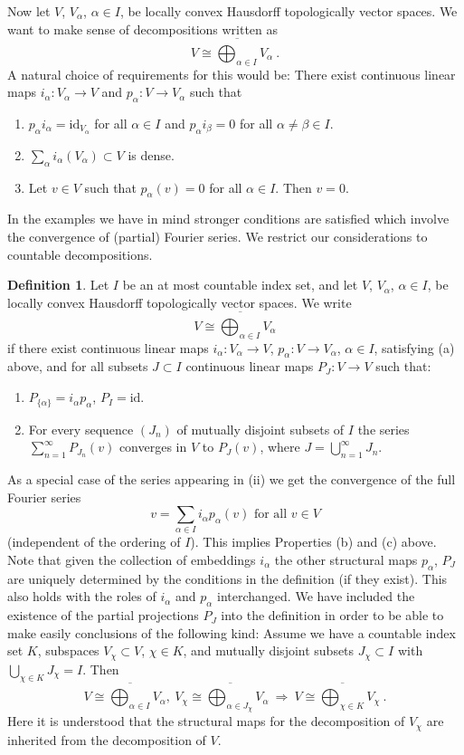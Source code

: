 \documentclass[10]{amsart}
\theoremstyle{remark}
\theoremstyle{definition}
\newtheorem{Def}[thm]{Definition}
\numberwithin{equation}{section}
\newcommand{\id}{\mathrm{id}}
\newcommand{\be}{\begin{equation}}
\begin{document}
{Now let $V$, $V_\alpha$, $\alpha\in I$, be locally convex Hausdorff topologically vector spaces. We want to make sense of decompositions written as
$$    V\cong \overline{\bigoplus_{\alpha\in I}} V_\alpha\ . $$
A natural choice of requirements for this would be: There exist continuous linear maps $i_\alpha: V_\alpha \rightarrow V$ and $p_\alpha: V\rightarrow V_\alpha$ such that
\begin{enumerate}
\item $p_\alpha i_\alpha=\id_{V_\alpha}$ for all $\alpha\in I$ and $p_\alpha i_\beta=0$ for all $\alpha\ne\beta\in I$.
\item $\sum_{\alpha} i_\alpha(V_\alpha)\subset V$ is dense.
\item Let $v\in V$ such that $p_\alpha (v)=0$ for all $\alpha\in I$. Then $v=0$.
\end{enumerate}

In the examples we have in mind stronger conditions are satisfied which involve the convergence of (partial) Fourier series. We restrict our considerations to countable decompositions.
\begin{Def}\label{kobold}
Let $I$ be an at most countable index set, and let $V$, $V_\alpha$, $\alpha\in I$, be locally convex Hausdorff topologically vector spaces. We write 
$$    V\cong \overline{\bigoplus_{\alpha\in I}} V_\alpha $$
if there exist continuous linear maps $i_\alpha: V_\alpha \rightarrow V$, $p_\alpha: V\rightarrow V_\alpha$, $\alpha\in I$, satisfying (a) above, and for all subsets $J\subset I$
continuous linear maps $P_J: V\rightarrow V$ such that:
\begin{enumerate}
\item[(i)] $P_{\{\alpha\}}=i_\alpha p_\alpha$, $P_I =\id$.
\item[(ii)] For every sequence $(J_n)$ of mutually disjoint subsets of $I$ the series $\sum_{n=1}^{\infty}P_{J_n}(v) $
converges in $V$ to $P_J(v)$, where $J=\bigcup_{n=1}^\infty J_n$.
\end{enumerate}
\end{Def}
As a special case of the series appearing in (ii) we get the convergence of the full Fourier series $$v=\sum_{\alpha\in I} i_\alpha p_\alpha (v)\mbox{  for all }v\in V$$
(independent of the ordering of $I$).
This implies Properties (b) and (c) above. Note that given the collection of embeddings $i_\alpha$ the other structural maps $p_\alpha$, $P_J$ are uniquely determined by
the conditions in the definition (if they exist). This also holds with the roles of $i_\alpha$ and $p_\alpha$ interchanged.
We have included the existence of the partial projections $P_J$ into the definition in order to be able to make easily conclusions of the following kind: 
Assume we have a countable index set $K$, subspaces $V_\chi\subset V$, $\chi\in K$, and mutually disjoint subsets $J_\chi\subset I$ with $\bigcup_{\chi\in K} J_\chi =I$. Then
\be\label{matisse}
V\cong \overline{\bigoplus_{\alpha\in I}} V_\alpha, \ V_\chi\cong \overline{\bigoplus_{\alpha\in J_\chi}} V_\alpha\ \Longrightarrow\ V\cong \overline{\bigoplus_{\chi\in K}} V_\chi\ .
\end{equation}
Here it is understood that the structural maps for the decomposition of $V_\chi$ are inherited from the decomposition of $V$.

}
\end{document}
